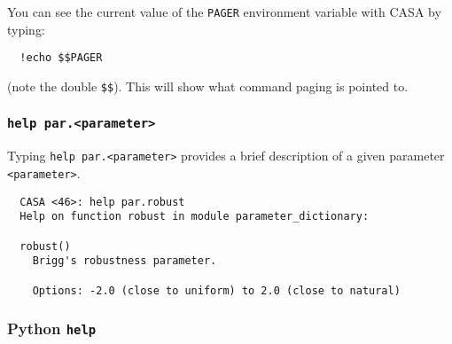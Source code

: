 You can see the current value of the {\tt PAGER} environment variable
with CASA by typing:
\small
\begin{verbatim}
  !echo $$PAGER
\end{verbatim}
\normalsize
(note the double {\tt \$\$}).  This will show what command paging is
pointed to.

\subsubsection{{\tt help par.<parameter>}}
\label{section:intro.basics.help.par}

Typing {\tt help par.<parameter>} provides a brief description of a 
given parameter {\tt <parameter>}.
\small
\begin{verbatim}
  CASA <46>: help par.robust
  Help on function robust in module parameter_dictionary:

  robust()
    Brigg's robustness parameter.

    Options: -2.0 (close to uniform) to 2.0 (close to natural)
\end{verbatim}
\normalsize

\subsubsection{Python {\tt help}}
\label{section:intro.basics.help.py}

